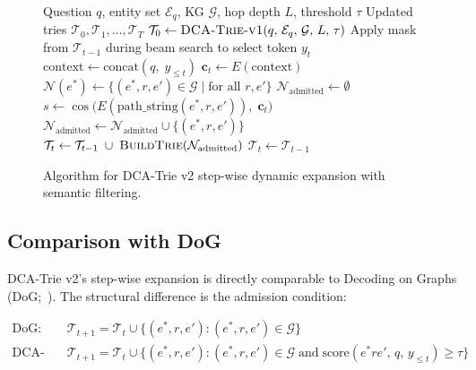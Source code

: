 \begin{figure}[H]
    \begin{algorithm}[H]
        \caption{DCA-Trie v2 --- Step-Wise Dynamic Expansion}
        \label{alg:v2}
        \begin{algorithmic}[1]
            \Require Question $q$, entity set $\mathcal{E}_q$, KG $\mathcal{G}$, hop depth $L$, threshold $\tau$
            \Ensure Updated tries $\mathcal{T}_0, \mathcal{T}_1, \ldots, \mathcal{T}_T$
            \State $\mathcal{T}_0 \leftarrow \textsc{DCA-Trie-v1}(q,\, \mathcal{E}_q,\, \mathcal{G},\, L,\, \tau)$
            \State Apply mask from $\mathcal{T}_{t-1}$ during beam search to select token $y_t$
            \State $\text{context} \leftarrow \text{concat}(q,\; y_{\leq t})$
            \State $\mathbf{c}_t \leftarrow E(\text{context})$
            \State $\mathcal{N}(e^*) \leftarrow \{(e^*, r, e') \in \mathcal{G} \mid \text{for all } r, e'\}$
            \State $\mathcal{N}_{\text{admitted}} \leftarrow \emptyset$
            \State $s \leftarrow \cos\!\bigl(E(\text{path\_string}(e^*, r, e')),\; \mathbf{c}_t\bigr)$
            \State $\mathcal{N}_{\text{admitted}} \leftarrow \mathcal{N}_{\text{admitted}} \cup \{(e^*, r, e')\}$
            \EndIf
            \EndFor
            \State $\mathcal{T}_t \leftarrow \mathcal{T}_{t-1} \;\cup\; \textsc{BuildTrie}(\mathcal{N}_{\text{admitted}})$
            \Else
            \State $\mathcal{T}_t \leftarrow \mathcal{T}_{t-1}$
            \EndIf
            \EndFor
        \end{algorithmic}
    \end{algorithm}
    \caption{Algorithm for DCA-Trie v2 step-wise dynamic expansion with semantic filtering.}
    \label{fig:alg_v2}
\end{figure}

\subsection{Comparison with DoG}

DCA-Trie v2's step-wise expansion is directly comparable to Decoding on Graphs (DoG;~\citealt{li2024dog}). The structural difference is the admission condition:

\begin{align*}
    \text{DoG:}         & \quad \mathcal{T}_{t+1} = \mathcal{T}_t \cup \{(e^*, r, e') : (e^*, r, e') \in \mathcal{G}\}                                                                  \\
    \text{DCA-Trie v2:} & \quad \mathcal{T}_{t+1} = \mathcal{T}_t \cup \{(e^*, r, e') : (e^*, r, e') \in \mathcal{G} \;\text{and}\; \text{score}(e^*re',\, q,\, y_{\leq t}) \geq \tau\}
\end{align*}

